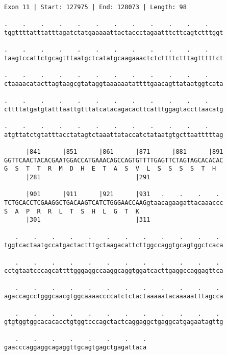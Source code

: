 \documentclass{article}
\begin{document}
\begin{Verbatim}[fontfamily=courier]
Exon 11 | Start: 127975 | End: 128073 | Length: 98

.    .    .    .    .    .    .    .    .    .    .    .    
tggttttatttatttagatctatgaaaaattactaccctagaatttcttcagtctttggt

.    .    .    .    .    .    .    .    .    .    .    .    
taagtccattctgcagtttaatgctcatatgcaagaaactctcttttctttagtttttct

.    .    .    .    .    .    .    .    .    .    .    .    
ctaaaacatacttagtaagcgtataggtaaaaaatattttgaacagttataatggtcata

.    .    .    .    .    .    .    .    .    .    .    .    
cttttatgatgtatttaattgtttatcatacagacacttcatttggagtaccttaacatg

.    .    .    .    .    .    .    .    .    .    .    .    
atgttatctgtatttacctatagtctaaattataccatctataatgtgcttaatttttag

      |841      |851      |861      |871      |881      |891
GGTTCAACTACACGAATGGACCATGAAACAGCCAGTGTTTTGAGTTCTAGTAGCACACAC
G  S  T  T  R  M  D  H  E  T  A  S  V  L  S  S  S  S  T  H  
      |281                          |291                    

      |901      |911      |921      |931   .    .    .    . 
TCTGCACCTCGAAGGCTGACAAGTCATCTGGGAACCAAGgtaacagaagattacaaaccc
S  A  P  R  R  L  T  S  H  L  G  T  K                       
      |301                          |311                    

   .    .    .    .    .    .    .    .    .    .    .    . 
tggtcactaatgccatgactactttgctaagacattcttggccaggtgcagtggctcaca

   .    .    .    .    .    .    .    .    .    .    .    . 
cctgtaatcccagcattttgggaggccaaggcaggtggatcacttgaggccaggagttca

   .    .    .    .    .    .    .    .    .    .    .    . 
agaccagcctgggcaacgtggcaaaaccccatctctactaaaaatacaaaaatttagcca

   .    .    .    .    .    .    .    .    .    .    .    . 
gtgtggtggcacacacctgtggtcccagctactcaggaggctgaggcatgagaatagttg

   .    .    .    .    .    .    .    .
gaacccaggaggcagaggttgcagtgagctgagattaca
\end{Verbatim}
\newpage
\end{document}
